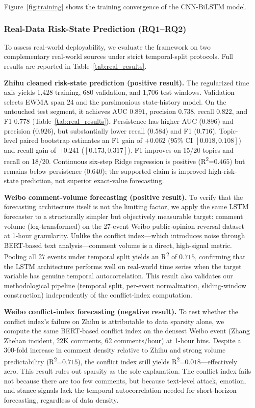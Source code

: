 \documentclass[journal]{IEEEtran}
\begin{document}
Figure~\ref{fig:training} shows the training convergence of the CNN-BiLSTM model.

\subsubsection{Real-Data Risk-State Prediction (RQ1--RQ2)}

To assess real-world deployability, we evaluate the framework on two complementary real-world sources under strict temporal-split protocols. Full results are reported in Table~\ref{tab:real_results}.

\textbf{Zhihu cleaned risk-state prediction (positive result).} The regularized time axis yields 1,428 training, 680 validation, and 1,706 test windows. Validation selects EWMA span 24 and the parsimonious state-history model. On the untouched test segment, it achieves AUC $0.891$, precision $0.738$, recall $0.822$, and F1 $0.778$ (Table~\ref{tab:real_results}). Persistence has higher AUC ($0.896$) and precision ($0.926$), but substantially lower recall ($0.584$) and F1 ($0.716$). Topic-level paired bootstrap estimates an F1 gain of $+0.062$ (95\% CI $[0.018,0.108]$) and recall gain of $+0.241$ ($[0.173,0.317]$). F1 improves on 15/20 topics and recall on 18/20. Continuous six-step Ridge regression is positive (R\textsuperscript{2}=$0.465$) but remains below persistence ($0.640$); the supported claim is improved high-risk-state prediction, not superior exact-value forecasting.

\textbf{Weibo comment-volume forecasting (positive result).} To verify that the forecasting architecture itself is not the limiting factor, we apply the same LSTM forecaster to a structurally simpler but objectively measurable target: comment volume (log-transformed) on the 27-event Weibo public-opinion reversal dataset~\cite{Zhang2023Reversal} at 1-hour granularity. Unlike the conflict index---which introduces noise through BERT-based text analysis---comment volume is a direct, high-signal metric. Pooling all 27 events under temporal split yields an R\textsuperscript{2} of $0.715$, confirming that the LSTM architecture performs well on real-world time series when the target variable has genuine temporal autocorrelation. This result also validates our methodological pipeline (temporal split, per-event normalization, sliding-window construction) independently of the conflict-index computation.

\textbf{Weibo conflict-index forecasting (negative result).} To test whether the conflict index's failure on Zhihu is attributable to data sparsity alone, we compute the same BERT-based conflict index on the densest Weibo event (Zhang Zhehan incident, 22K comments, 62 comments/hour) at 1-hour bins. Despite a 300-fold increase in comment density relative to Zhihu and strong volume predictability (R\textsuperscript{2}=$0.715$), the conflict index still yields R\textsuperscript{2}=$0.018$---effectively zero. This result rules out sparsity as the sole explanation. The conflict index fails not because there are too few comments, but because text-level attack, emotion, and stance signals lack the temporal autocorrelation needed for short-horizon forecasting, regardless of data density.
\end{document}
